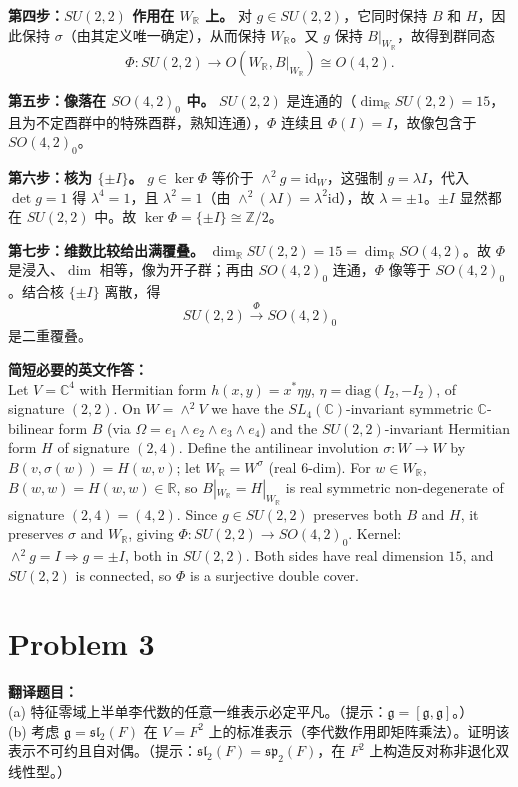 \documentclass{ctexart}
\begin{document}
\textbf{第四步：$SU(2,2)$ 作用在 $W_{\mathbb{R}}$ 上。} 对 $g \in SU(2,2)$，它同时保持 $B$ 和 $H$，因此保持 $\sigma$（由其定义唯一确定），从而保持 $W_{\mathbb{R}}$。又 $g$ 保持 $B|_{W_{\mathbb{R}}}$，故得到群同态
\[
\Phi: SU(2,2) \longrightarrow O(W_{\mathbb{R}}, B|_{W_{\mathbb{R}}}) \cong O(4, 2).
\]

\textbf{第五步：像落在 $SO(4,2)_{0}$ 中。} $SU(2,2)$ 是连通的（$\dim_{\mathbb{R}} SU(2,2) = 15$，且为不定酉群中的特殊酉群，熟知连通），$\Phi$ 连续且 $\Phi(I) = I$，故像包含于 $SO(4,2)_{0}$。

\textbf{第六步：核为 $\{\pm I\}$。} $g \in \ker \Phi$ 等价于 $\wedge^{2} g = \mathrm{id}_{W}$，这强制 $g = \lambda I$，代入 $\det g = 1$ 得 $\lambda^{4} = 1$，且 $\lambda^{2} = 1$（由 $\wedge^{2}(\lambda I) = \lambda^{2} \mathrm{id}$），故 $\lambda = \pm 1$。$\pm I$ 显然都在 $SU(2,2)$ 中。故 $\ker \Phi = \{\pm I\} \cong \mathbb{Z}/2$。

\textbf{第七步：维数比较给出满覆叠。} $\dim_{\mathbb{R}} SU(2,2) = 15 = \dim_{\mathbb{R}} SO(4,2)$。故 $\Phi$ 是浸入、$\dim$ 相等，像为开子群；再由 $SO(4,2)_0$ 连通，$\Phi$ 像等于 $SO(4,2)_{0}$。结合核 $\{\pm I\}$ 离散，得
\[
SU(2,2) \xrightarrow{\ \Phi\ } SO(4,2)_{0}
\]
是二重覆叠。

\vspace{1em}
\textbf{简短必要的英文作答：}\\
Let $V = \mathbb{C}^4$ with Hermitian form $h(x,y)=x^{*}\eta y$, $\eta=\mathrm{diag}(I_2,-I_2)$, of signature $(2,2)$. On $W = \wedge^2 V$ we have the $SL_4(\mathbb{C})$-invariant symmetric $\mathbb{C}$-bilinear form $B$ (via $\Omega = e_1\wedge e_2 \wedge e_3\wedge e_4$) and the $SU(2,2)$-invariant Hermitian form $H$ of signature $(2,4)$. Define the antilinear involution $\sigma:W\to W$ by $B(v,\sigma(w))=H(w,v)$; let $W_{\mathbb{R}}=W^{\sigma}$ (real $6$-dim). For $w\in W_{\mathbb{R}}$, $B(w,w)=H(w,w)\in\mathbb{R}$, so $B|_{W_{\mathbb{R}}}=H|_{W_{\mathbb{R}}}$ is real symmetric non-degenerate of signature $(2,4)=(4,2)$. Since $g\in SU(2,2)$ preserves both $B$ and $H$, it preserves $\sigma$ and $W_{\mathbb{R}}$, giving $\Phi:SU(2,2)\to SO(4,2)_0$. Kernel: $\wedge^2 g = I \Rightarrow g = \pm I$, both in $SU(2,2)$. Both sides have real dimension $15$, and $SU(2,2)$ is connected, so $\Phi$ is a surjective double cover.

\vspace{2em}
\section*{Problem 3}
\textbf{翻译题目：}\\
(a) 特征零域上半单李代数的任意一维表示必定平凡。（提示：$\mathfrak{g} = [\mathfrak{g}, \mathfrak{g}]$。）\\
(b) 考虑 $\mathfrak{g} = \mathfrak{sl}_2(F)$ 在 $V = F^{2}$ 上的标准表示（李代数作用即矩阵乘法）。证明该表示不可约且自对偶。（提示：$\mathfrak{sl}_{2}(F) = \mathfrak{sp}_{2}(F)$，在 $F^{2}$ 上构造反对称非退化双线性型。）
\end{document}
